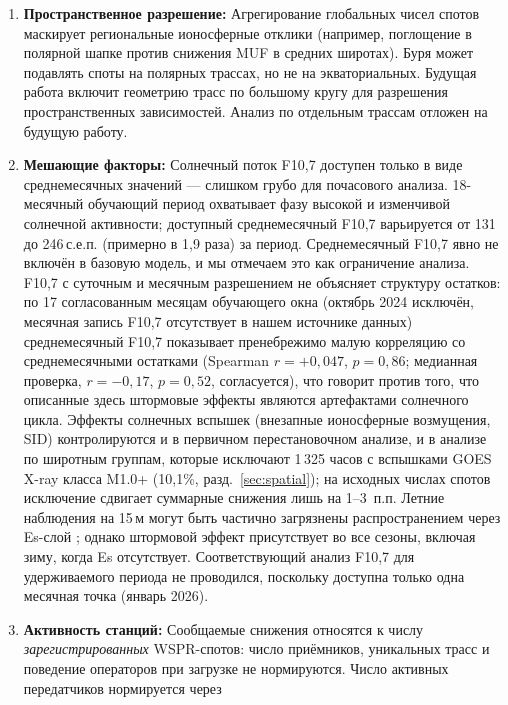 \documentclass{agujournal2019}
\begin{document}
\begin{enumerate}
	\item \textbf{Пространственное разрешение:} Агрегирование глобальных
	      чисел спотов маскирует региональные ионосферные отклики (например,
	      поглощение в полярной шапке против снижения MUF в средних широтах).
	      Буря может подавлять споты на полярных трассах, но не на
	      экваториальных. Будущая работа включит геометрию трасс по большому
	      кругу для разрешения пространственных зависимостей. Анализ
	      по отдельным трассам отложен на будущую работу.
	\item \textbf{Мешающие факторы:} Солнечный поток F10,7 доступен только
	      в виде среднемесячных значений — слишком грубо для почасового
	      анализа. 18-месячный обучающий период охватывает фазу высокой
	      и изменчивой солнечной активности; доступный среднемесячный F10,7
	      варьируется от 131 до 246\,с.е.п. (примерно в 1,9 раза) за период.
	      Среднемесячный F10,7 явно не включён в базовую модель, и мы
	      отмечаем это как ограничение анализа. F10,7 с суточным и месячным
	      разрешением не объясняет структуру остатков: по 17 согласованным
	      месяцам обучающего окна (октябрь 2024 исключён, месячная запись
	      F10,7 отсутствует в нашем источнике данных) среднемесячный F10,7
	      показывает пренебрежимо малую корреляцию со среднемесячными
	      остатками (Spearman $r = +0{,}047$, $p = 0{,}86$; медианная проверка,
	      $r = -0{,}17$, $p = 0{,}52$, согласуется), что говорит против того,
	      что описанные здесь штормовые эффекты являются артефактами
	      солнечного цикла. Эффекты солнечных вспышек (внезапные ионосферные
	      возмущения, SID) \citep{mitra1974} контролируются и в первичном перестановочном анализе, и в анализе
	      по широтным группам, которые исключают 1\,325 часов с вспышками
	      GOES X-ray класса M1.0+ (10,1\%, разд.~\ref{sec:spatial}); на
	      исходных числах спотов исключение сдвигает суммарные снижения
	      лишь на 1--3~п.п.
	      Летние наблюдения на 15\,м могут быть частично загрязнены
	      распространением через Es-слой \citep{whitehead1989}; однако
	      штормовой эффект присутствует во все сезоны, включая зиму, когда
	      Es отсутствует. Соответствующий анализ F10,7 для удерживаемого
	      периода не проводился, поскольку доступна только одна месячная
	      точка (январь 2026).
	\item \textbf{Активность станций:} Сообщаемые снижения относятся к числу
	      \emph{зарегистрированных} WSPR-спотов: число приёмников,
	      уникальных трасс и поведение операторов при загрузке не
	      нормируются. Число активных передатчиков нормируется через

\end{enumerate}
\end{document}
